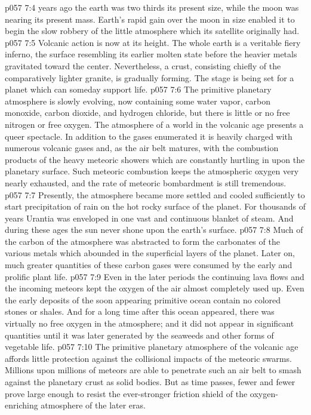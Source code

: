 \pc \vs p057 7:4  years ago the earth was two thirds its present size, while the moon was nearing its present mass. Earth’s rapid gain over the moon in size enabled it to begin the slow robbery of the little atmosphere which its satellite originally had.
\vs p057 7:5 Volcanic action is now at its height. The whole earth is a veritable fiery inferno, the surface resembling its earlier molten state before the heavier metals gravitated toward the center.  Nevertheless, a crust, consisting chiefly of the comparatively lighter granite, is gradually forming. The stage is being set for a planet which can someday support life.
\pc \vs p057 7:6 The primitive planetary atmosphere is slowly evolving, now containing some water vapor, carbon monoxide, carbon dioxide, and hydrogen chloride, but there is little or no free nitrogen or free oxygen. The atmosphere of a world in the volcanic age presents a queer spectacle. In addition to the gases enumerated it is heavily charged with numerous volcanic gases and, as the air belt matures, with the combustion products of the heavy meteoric showers which are constantly hurtling in upon the planetary surface. Such meteoric combustion keeps the atmospheric oxygen very nearly exhausted, and the rate of meteoric bombardment is still tremendous.
\pc \vs p057 7:7 Presently, the atmosphere became more settled and cooled sufficiently to start precipitation of rain on the hot rocky surface of the planet. For thousands of years Urantia was enveloped in one vast and continuous blanket of steam. And during these ages the sun never shone upon the earth’s surface.
\vs p057 7:8 Much of the carbon of the atmosphere was abstracted to form the carbonates of the various metals which abounded in the superficial layers of the planet. Later on, much greater quantities of these carbon gases were consumed by the early and prolific plant life.
\vs p057 7:9 Even in the later periods the continuing lava flows and the incoming meteors kept the oxygen of the air almost completely used up. Even the early deposits of the soon appearing primitive ocean contain no colored stones or shales. And for a long time after this ocean appeared, there was virtually no free oxygen in the atmosphere; and it did not appear in significant quantities until it was later generated by the seaweeds and other forms of vegetable life.
\vs p057 7:10 The primitive planetary atmosphere of the volcanic age affords little protection against the collisional impacts of the meteoric swarms. Millions upon millions of meteors are able to penetrate such an air belt to smash against the planetary crust as solid bodies. But as time passes, fewer and fewer prove large enough to resist the ever\hyp{}stronger friction shield of the oxygen\hyp{}enriching atmosphere of the later eras.
